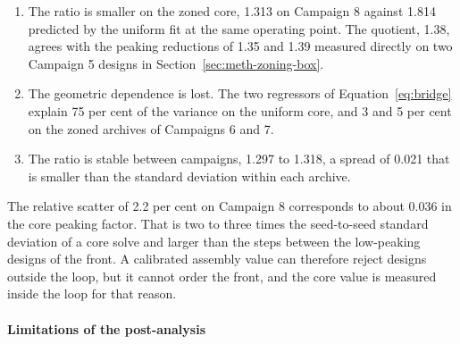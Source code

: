 \begin{enumerate}
  \item The ratio is smaller on the zoned core, 1.313 on Campaign 8
        against 1.814 predicted by the uniform fit at the same
        operating point. The quotient, 1.38, agrees with the peaking
        reductions of 1.35 and 1.39 measured directly on two Campaign 5
        designs in Section~\ref{sec:meth-zoning-box}.

  \item The geometric dependence is lost. The two regressors of
        Equation~\eqref{eq:bridge} explain 75 per cent of the variance
        on the uniform core, and 3 and 5 per cent on the zoned archives
        of Campaigns 6 and 7.

  \item The ratio is stable between campaigns, 1.297 to 1.318, a
        spread of 0.021 that is smaller than the standard deviation
        within each archive.
\end{enumerate}

The relative scatter of 2.2 per cent on Campaign 8 corresponds to about
0.036 in the core peaking factor. That is two to three times the
seed-to-seed standard deviation of a core solve and larger than the
steps between the low-peaking designs of the front. A calibrated
assembly value can therefore reject designs outside the loop, but it
cannot order the front, and the core value is measured inside the loop
for that reason.

\paragraph{Limitations of the post-analysis}
\label{sec:res-c8-post-limits}

